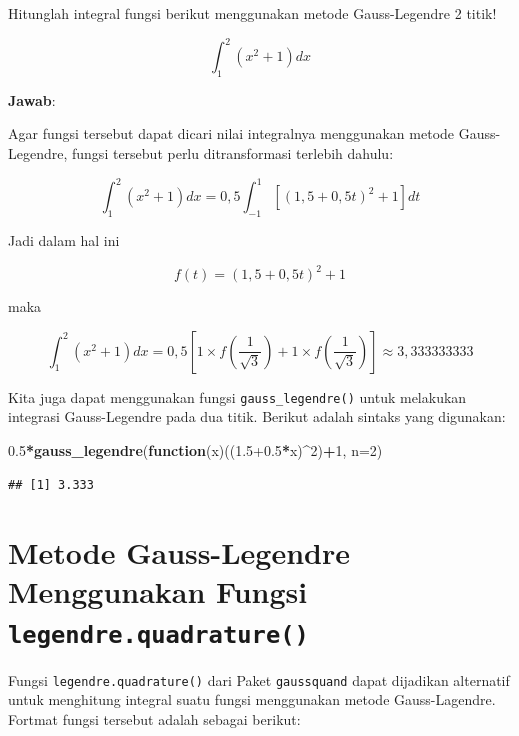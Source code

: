 \documentclass[]{book}
\newenvironment{Shaded}{\begin{snugshade}}{\end{snugshade}}
\newcommand{\ControlFlowTok}[1]{\textcolor[rgb]{0.13,0.29,0.53}{\textbf{#1}}}
\newcommand{\DataTypeTok}[1]{\textcolor[rgb]{0.13,0.29,0.53}{#1}}
\newcommand{\DecValTok}[1]{\textcolor[rgb]{0.00,0.00,0.81}{#1}}
\newcommand{\FloatTok}[1]{\textcolor[rgb]{0.00,0.00,0.81}{#1}}
\newcommand{\KeywordTok}[1]{\textcolor[rgb]{0.13,0.29,0.53}{\textbf{#1}}}
\newcommand{\NormalTok}[1]{#1}
\newcommand{\OperatorTok}[1]{\textcolor[rgb]{0.81,0.36,0.00}{\textbf{#1}}}
\theoremstyle{definition}
\theoremstyle{definition}
\theoremstyle{definition}
\theoremstyle{remark}
\let\BeginKnitrBlock\begin \let\EndKnitrBlock\end
\begin{document}
\BeginKnitrBlock{example}
\protect\hypertarget{exm:gausslanexm}{}{\label{exm:gausslanexm} }Hitunglah integral fungsi berikut menggunakan metode Gauss-Legendre 2 titik!
\EndKnitrBlock{example}

\[
\int_1^2 \left(x^2+1\right)dx
\]

\textbf{Jawab}:

Agar fungsi tersebut dapat dicari nilai integralnya menggunakan metode Gauss-Legendre, fungsi tersebut perlu ditransformasi terlebih dahulu:

\[
\int_1^2 \left(x^2+1\right)dx=0,5\int_{-1}^1 \left[\left(1,5+0,5t\right)^2+1\right]dt
\]

Jadi dalam hal ini

\[
f\left(t\right)=\left(1,5+0,5t\right)^2+1
\]

maka

\[
\int_1^2 \left(x^2+1\right)dx=0,5\left[1\times f\left(\frac{1}{\sqrt{3}}\right)+1\times f\left(\frac{1}{\sqrt{3}}\right)\right]\approx 3,333333333
\]

Kita juga dapat menggunakan fungsi \texttt{gauss\_legendre()} untuk melakukan integrasi Gauss-Legendre pada dua titik. Berikut adalah sintaks yang digunakan:

\begin{Shaded}
\begin{Highlighting}[]
\FloatTok{0.5}\OperatorTok{*}\KeywordTok{gauss_legendre}\NormalTok{(}\ControlFlowTok{function}\NormalTok{(x)((}\FloatTok{1.5+0.5}\OperatorTok{*}\NormalTok{x)}\OperatorTok{^}\DecValTok{2}\NormalTok{)}\OperatorTok{+}\DecValTok{1}\NormalTok{,}
               \DataTypeTok{n=}\DecValTok{2}\NormalTok{)}
\end{Highlighting}
\end{Shaded}

\begin{verbatim}
## [1] 3.333
\end{verbatim}

\hypertarget{othergauss}{%
\section{\texorpdfstring{Metode Gauss-Legendre Menggunakan Fungsi \texttt{legendre.quadrature()}}{Metode Gauss-Legendre Menggunakan Fungsi legendre.quadrature()}}\label{othergauss}}

Fungsi \texttt{legendre.quadrature()} dari Paket \texttt{gaussquand} dapat dijadikan alternatif untuk menghitung integral suatu fungsi menggunakan metode Gauss-Lagendre. Fortmat fungsi tersebut adalah sebagai berikut:
\end{document}

